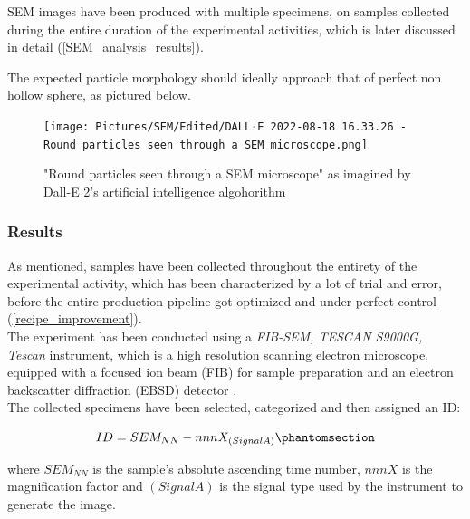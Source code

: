 \documentclass{article}
\begin{document}
        SEM images have been produced with multiple specimens, on samples collected during the entire duration of the experimental 
        activities, which is later discussed in detail (\ref{SEM_analysis_results}). 

        The expected particle morphology should ideally approach that of perfect non hollow sphere, as pictured below. 

            \begin{figure}[h!]
                \centering
                \texttt{[image: Pictures/SEM/Edited/DALL·E 2022-08-18 16.33.26 - Round particles seen through a SEM microscope.png]}
                \caption{"Round particles seen through a SEM microscope" as imagined by Dall-E 2's artificial intelligence algohorithm \autocites{DALLE2}{DALLE2_roundparticles}}
                \label{fig:SEM_DALLE2}
            \end{figure}

            \clearpage
            \subsubsection{Results\label{SEM_analysis_results}}

            As mentioned, samples have been collected throughout the entirety of the experimental activity, which has been characterized by a lot of trial and error, 
            before the entire production pipeline got optimized and 
            under perfect control (\ref{recipe_improvement}). \\ 

            The experiment has been conducted using a \textit{FIB-SEM, TESCAN S9000G, Tescan} instrument, which is a high resolution 
            scanning electron microscope, equipped with a focused ion beam (FIB) for sample preparation and 
            an electron backscatter diffraction (EBSD) detector \autocites{FIB-SEM_TESCAN_S9000G}. \\

            The collected specimens have been selected, categorized and then assigned an ID:

            \begin{equation}
                ID = SEM_{NN}-nnnX_{(SignalA)}
                \phantomsection
                \label{eq:SEM_ID}
            \end{equation}

            where $SEM_{NN}$ is the sample's absolute ascending time number, $nnnX$ is the magnification factor and $(SignalA)$ is the signal type 
            used by the instrument to generate the image. \\ 
\end{document}
